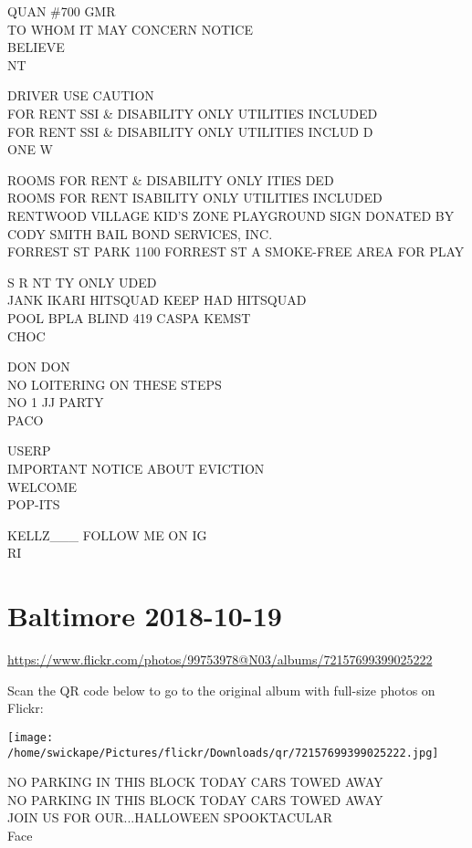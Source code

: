 \documentclass[10pt,letterpaper]{article}
\begin{document}
QUAN \#700 GMR\\
TO WHOM IT MAY CONCERN NOTICE\\
BELIEVE\\
NT

DRIVER USE CAUTION\\
FOR RENT SSI \& DISABILITY ONLY UTILITIES INCLUDED\\
FOR RENT SSI \& DISABILITY ONLY UTILITIES INCLUD D\\
ONE W

ROOMS FOR RENT \& DISABILITY ONLY ITIES DED\\
ROOMS FOR RENT ISABILITY ONLY UTILITIES INCLUDED\\
RENTWOOD VILLAGE KID'S ZONE PLAYGROUND SIGN DONATED BY CODY SMITH BAIL BOND SERVICES, INC.\\
FORREST ST PARK 1100 FORREST ST A SMOKE{-}FREE AREA FOR PLAY

S R NT TY ONLY UDED\\
JANK IKARI HITSQUAD KEEP HAD HITSQUAD\\
POOL BPLA BLIND 419 CASPA KEMST\\
CHOC

DON DON\\
NO LOITERING ON THESE STEPS\\
NO 1 JJ PARTY\\
PACO

USERP\\
IMPORTANT NOTICE ABOUT EVICTION\\
WELCOME\\
POP{-}ITS

KELLZ\_\_\_ FOLLOW ME ON IG\\
RI


\section*{Baltimore 2018-10-19}

\url{https://www.flickr.com/photos/99753978@N03/albums/72157699399025222}

Scan the QR code below to go to the original album with full-size photos on Flickr:

\texttt{[image: /home/swickape/Pictures/flickr/Downloads/qr/72157699399025222.jpg]}


NO PARKING IN THIS BLOCK TODAY CARS TOWED AWAY\\
NO PARKING IN THIS BLOCK TODAY CARS TOWED AWAY\\
JOIN US FOR OUR...HALLOWEEN SPOOKTACULAR\\
Face
\end{document}
